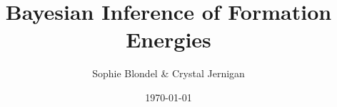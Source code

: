 \documentclass[10pt]{beamer}
\begin{document}
\title{\textbf{Bayesian Inference of Formation Energies}} 
\author{Sophie Blondel \& Crystal Jernigan}  
\date{\today}

\frame{\titlepage}

% 	
% 	
% 	
% 
% 	
% 	
% 	
% 
\end{document}
